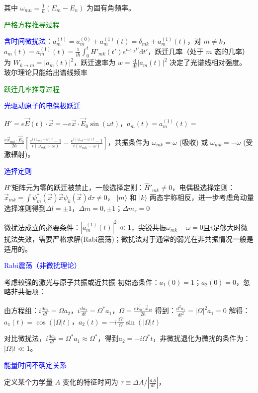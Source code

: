 \documentclass[a4paper,8pt]{extarticle} %
\newcommand{\bluetext}[1]{\textcolor{blue}{#1}}
\newcommand{\greentext}[1]{\textcolor{green}{#1}}
\begin{document}
\begin{multicols}{3}
其中 $\omega_{mn} = \frac{1}{\hbar}(E_m - E_n)$ 为固有角频率。

\greentext{严格方程推导过程}

\bluetext{含时间微扰法}：$a_m^{(t)} = a_m^{(0)} + a_m^{(1)}(t) = \delta_{mk} + a_m^{(1)}(t)$，对 $m \neq k$，$a_m(t) = a_m^{(1)}(t) = \frac{1}{i\hbar}\int_0^t H'_{mk}(t')e^{i\omega_{mk}t'} \mathrm{d}t'$，跃迁几率（处于 $m$ 态的几率）为 $W_{k\to m} = |a_m(t)|^2$，跃迁速率为 $w = \frac{\mathrm{d}}{{\mathrm{d}t}}|a_m(t)|^2$ 决定了光谱线相对强度。
玻尔理论只能给出谱线频率

\greentext{跃迁几率推导过程}

\bluetext{光驱动原子的电偶极跃迁}

$H' = e\vec{E}(t)\cdot\vec{x} = -e\vec{x}\cdot\vec{E}_0\sin(\omega t)$，$a_m(t) = a_m^{(1)}(t) =$ 

$ \frac{e\vec{x}_{mk}\cdot\vec{E}_0}{2\hbar}\left[\frac{e^{i(\omega_{mk}+\omega)t}-1}{i(\omega_{mk}+\omega)} - \frac{e^{i(\omega_{mk}-\omega)t}-1}{i(\omega_{mk}-\omega)}\right]$，共振条件为 $\omega_{mk} = \omega$ (吸收) 或 $\omega_{mk} = -\omega$ (受激辐射)。

\bluetext{选择定则}

$H'$矩阵元为零的跃迁被禁止，一般选择定则：$\hat{H}'_{mk}\neq 0$，电偶极选择定则：$\vec{x}_{mk}=\int{\psi_m^*(\vec{x})\vec{x}\psi_k(\vec{x}) d\tau} \neq 0$，
$|m\rangle$ 和 $|k\rangle$ 两态宇称相反，进一步考虑角动量选择准则得到$\Delta l = \pm1$，$\Delta m = 0, \pm1$；$\Delta m_s = 0$

微扰法成立的必要条件：$|a_m^{(1)}(t)|^2\ll 1$，尖锐共振$\omega_{mk}-\omega=0$且t足够大时微扰法失效，需要严格求解(Rabi震荡)；微扰法对于通常的弱光在非共振情况一般是适用的。

\bluetext{Rabi震荡（非微扰理论）}

考虑较强的激光与原子共振或近共振
初始态条件：$a_1(0) = 1$；$a_2(0) = 0$，忽略非共振项：

由方程组：$i\frac{da_1}{dt} = \Omega a_2$，$i\frac{da_2}{dt} = \Omega^* a_1$，$\Omega = \frac{e\vec{E}_0\cdot\vec{x}_{12}}{2\hbar}$ 得到：$\frac{d^2a_1}{dt^2} = |\Omega|^2 a_1 = 0$ 解得：$a_1(t) = \cos(|\Omega|t)$，$a_2(t) = -i\frac{|\Omega|}{\Omega}\sin(|\Omega|t)$

对比微扰法，$i\frac{da_2}{dt} = \Omega^* a_1 \approx \Omega^* $，得到$a_2 = -i\Omega^* t$，非微扰退化为微扰的条件为：$|\Omega|t \ll 1$。

\bluetext{能量时间不确定关系}

定义某个力学量 $A$ 变化的特征时间为 $\tau \equiv \Delta A/|\frac{d\overline{A}}{dt}|$，


\end{multicols}
\end{document}

